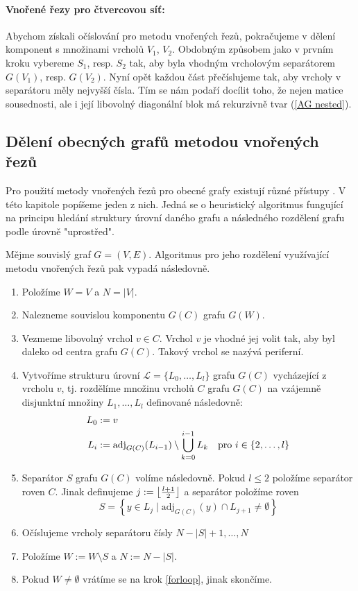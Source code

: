 \documentclass{ctuthesis}
\theoremstyle{plain}
\theoremstyle{definition}
\DeclarePairedDelimiter\floor{\lfloor}{\rfloor}
\begin{document}
\paragraph{Vnořené řezy pro čtvercovou síť: }

Abychom získali očíslování pro metodu vnořených řezů, pokračujeme v dělení komponent s množinami vrcholů $V_1$, $V_2$. Obdobným způsobem jako v prvním kroku vybereme $S_1$, resp. $S_2$ tak, aby byla vhodným vrcholovým separátorem $G(V_1)$, resp. $G(V_2)$. Nyní opět každou část přečíslujeme tak, aby vrcholy v separátoru měly nejvyšší čísla.
Tím se nám podaří docílit toho, že nejen matice sousednosti, ale i její libovolný diagonální blok má rekurzivně tvar (\ref{AG nested}).

\subsection{Dělení obecných grafů metodou vnořených řezů}
\label{NDobecne}

Pro použití metody vnořených řezů pro obecné grafy existují různé přístupy \cite{litaro:79}. V této kapitole popíšeme jeden z nich. Jedná se o heuristický algoritmus fungující na principu hledání struktury úrovní daného grafu a následného rozdělení grafu podle úrovně "uprostřed".

Mějme souvislý graf $G=(V,E)$. Algoritmus pro jeho rozdělení využívající metodu vnořených řezů pak vypadá následovně.

\begin{enumerate}
  \item Položíme $W=V$ a $N=|V|$.
  \item \label{forloop} Nalezneme souvislou komponentu $G(C)$ grafu $G(W)$.
  \item Vezmeme libovolný vrchol $v\in C$. Vrchol $v$ je vhodné jej volit tak, aby byl daleko od centra grafu \cite{lew:82} $G(C)$. Takový vrchol se nazývá periferní.
  \item Vytvoříme strukturu úrovní $\mathcal{L}=\{L_0, \ldots ,L_l\}$ grafu $G(C)$ vycházející z vrcholu $v$, tj. rozdělíme množinu vrcholů $C$ grafu $G(C)$ na vzájemně disjunktní množiny $L_1, \ldots, L_l$ definované následovně:
      \begin{align*}
        L_0 & := v \\
        L_i & := \mathrm{adj}_{G(C)}(L_{i-1}) \setminus \bigcup_{k=0}^{i-1} L_k \quad {\rm pro} \ i \in \{2,\ldots,l\}
      \end{align*}
  \item Separátor $S$ grafu $G(C)$ volíme následovně. Pokud $l \leq 2$ položíme separátor roven $C$. Jinak definujeme $j := \floor*{\frac{l+1}{2}}$ a separátor položíme roven
      \[
        S = \left\{y \in L_j \mid \mathrm{adj}_{G(C)}(y) \cap L_{j+1} \neq \emptyset \right\}
      \]
  \item Očíslujeme vrcholy separátoru čísly $N-|S|+1,\ldots,N$
  \item Položíme $W:=W \setminus S$ a $N := N-|S|$.
  \item Pokud $W \neq \emptyset$ vrátíme se na krok \ref{forloop}, jinak skončíme.
\end{enumerate}
\end{document}
